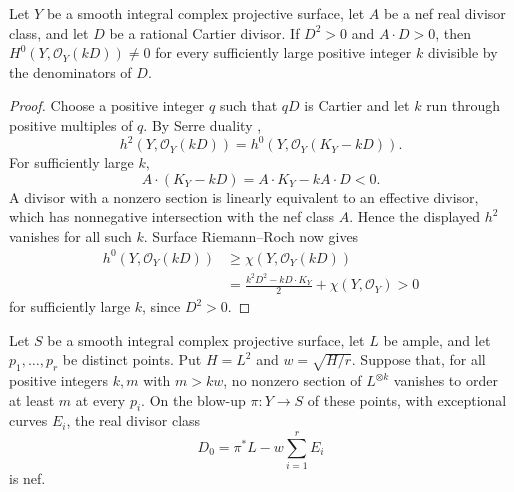 \begin{lemma}
\label{lem:positive-square}
Let $Y$ be a smooth integral complex projective surface, let $A$ be a nef real divisor class, and let $D$ be a rational Cartier divisor. If $D^2>0$ and $A\cdot D>0$, then $H^0(Y,\mathcal{O}_Y(kD))\ne0$ for every sufficiently large positive integer $k$ divisible by the denominators of $D$.
\end{lemma}

\begin{proof}
Choose a positive integer $q$ such that $qD$ is Cartier and let $k$ run through positive multiples of $q$. By Serre duality \cite[Tag \href{https://stacks.math.columbia.edu/tag/0FVV}{0FVV}, Lemma 48.27.1(6)--(7)]{Stacks},
\[
 h^2(Y,\mathcal{O}_Y(kD))
   =h^0(Y,\mathcal{O}_Y(K_Y-kD)).
\]
For sufficiently large $k$,
\[
 A\cdot(K_Y-kD)=A\cdot K_Y-kA\cdot D<0.
\]
A divisor with a nonzero section is linearly equivalent to an effective divisor, which has nonnegative intersection with the nef class $A$. Hence the displayed $h^2$ vanishes for all such $k$. Surface Riemann--Roch \cite[Tag \href{https://stacks.math.columbia.edu/tag/02UO}{02UO}]{Stacks} now gives
\[
 \begin{split}
 h^0(Y,\mathcal{O}_Y(kD))
 &\ge \chi(Y,\mathcal{O}_Y(kD))\\
 &=\frac{k^2D^2-kD\cdot K_Y}{2}+\chi(Y,\mathcal{O}_Y)>0
 \end{split}
\]
for sufficiently large $k$, since $D^2>0$.
\end{proof}

\begin{proposition}
\label{prop:homogeneous-nef}
Let $S$ be a smooth integral complex projective surface, let $L$ be ample, and let $p_1,\ldots,p_r$ be distinct points. Put $H=L^2$ and $w=\sqrt{H/r}$. Suppose that, for all positive integers $k,m$ with $m>kw$, no nonzero section of $L^{\otimes k}$ vanishes to order at least $m$ at every $p_i$. On the blow-up $\pi:Y\to S$ of these points, with exceptional curves $E_i$, the real divisor class
\[
 D_0=\pi^*L-w\sum_{i=1}^rE_i
\]
is nef.
\end{proposition}

